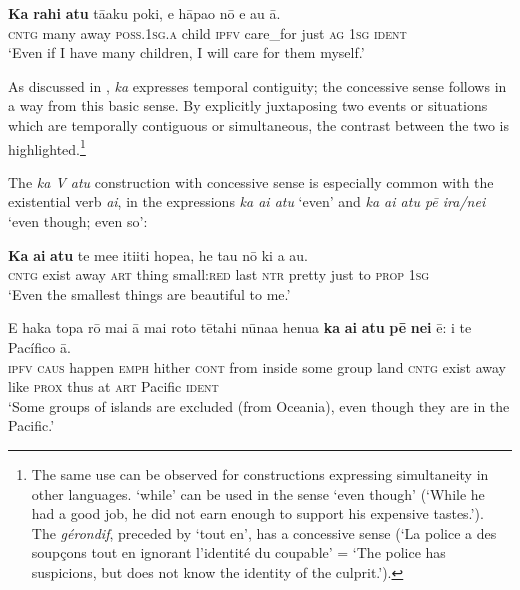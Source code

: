 \ea\label{ex:11.266}
\gll \textbf{Ka} \textbf{rahi} \textbf{atu} tā{\ꞌ}aku poki, e hāpa{\ꞌ}o nō e au {\ꞌ}ā. \\
\textsc{cntg} many away \textsc{poss.1sg.a} child \textsc{ipfv} care\_for just \textsc{ag} \textsc{1sg} \textsc{ident} \\

\glt
‘Even if I have many children, I will care for them myself.’ \textstyleExampleref{[R229.023]} 
\z

As discussed in , \textit{ka} expresses temporal contiguity; the concessive sense follows in a way from this basic sense. By explicitly juxtaposing two events or situations which are temporally contiguous or simultaneous, the contrast between the two is highlighted.\footnote{\label{fn:536}The same use can be observed for constructions expressing simultaneity in other languages.  ‘while’ can be used in the sense ‘even though’ (‘While he had a good job, he did not earn enough to support his expensive tastes.’). The  \textit{gérondif}, preceded by ‘tout en’, has a concessive sense (‘La police a des soupçons tout en ignorant l’identité du coupable’ = ‘The police has suspicions, but does not know the identity of the culprit.’).} 

The \textit{ka V atu} construction with concessive sense is especially common with the existential verb \textit{ai}, in the expressions \textit{ka ai atu} ‘even’ and \textit{ka ai atu pē ira/nei} ‘even though; even so’:

\ea\label{ex:11.267}
\gll \textbf{Ka} \textbf{ai} \textbf{atu} te me{\ꞌ}e {\ꞌ}iti{\ꞌ}iti hope{\ꞌ}a, he tau nō ki a au. \\
\textsc{cntg} exist away \textsc{art} thing small:\textsc{red} last \textsc{ntr} pretty just to \textsc{prop} \textsc{1sg} \\

\glt 
‘Even the smallest things are beautiful to me.’ \textstyleExampleref{[R224.037–038]}
\z

\ea\label{ex:11.268}
\gll E haka topa rō mai {\ꞌ}ā mai roto tētahi nūna{\ꞌ}a henua  \textbf{ka} \textbf{ai} \textbf{atu} \textbf{pē} \textbf{nei} ē: {\ꞌ}i te Pacífico {\ꞌ}ā.\\
\textsc{ipfv} \textsc{caus} happen \textsc{emph} hither \textsc{cont} from inside some group land  \textsc{cntg} exist away like \textsc{prox} thus at \textsc{art} Pacific \textsc{ident}\\

\glt 
‘Some groups of islands are excluded (from Oceania), even though they are in the Pacific.’ \textstyleExampleref{[R342.005]} 
\z


